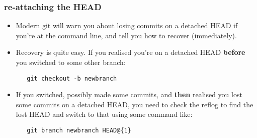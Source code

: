 \documentclass[presentation]{beamer}
\begin{document}
\begin{frame}[fragile]
\frametitle{re-attaching the HEAD}
\label{sec-10-6}


\begin{itemize}
\item Modern git will warn you about losing commits on a detached HEAD if you're at
  the command line, and tell you how to recover (immediately).
\item Recovery is quite easy.  If you realised you're on a detached HEAD \textbf{before}
  you switched to some other branch:

\begin{verbatim}
   git checkout -b newbranch
\end{verbatim}
\item If you switched, possibly made some commits, and \textbf{then} realised you lost some
  commits on a detached HEAD, you need to check the reflog to find the lost HEAD
  and switch to that using some command like:

\begin{verbatim}
   git branch newbranch HEAD@{1}
\end{verbatim}
\end{itemize}
\end{frame}
\end{document}
